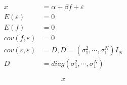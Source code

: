 \documentclass[10pt]{book}
\begin{document}
\begin{mdSnippets}
\begin{mdDisplaySnippet}[241cc0862a03c3f0cb7c5c6ad8ef3f5f]%
\[%
\begin{aligned}
x &= \alpha+\beta f+\varepsilon  \\ 
E(\varepsilon) &= 0\\ 
E(f)&= 0\\ 
 cov(f,\varepsilon)&=0 \\ 
 cov(\varepsilon,\varepsilon)&= D,D=(\sigma_1^2,\cdots ,\sigma_1^N)I_N\\ 
 D&= diag(\sigma_1^2,\cdots ,\sigma_1^N)
\end{aligned}
\]%
\end{mdDisplaySnippet}%
\begin{mdDisplaySnippet}[9dd4e461268c8034f5c8564e155c67a6]%
\[%
x
\]%
\end{mdDisplaySnippet}%

\end{mdSnippets}
\end{document}
